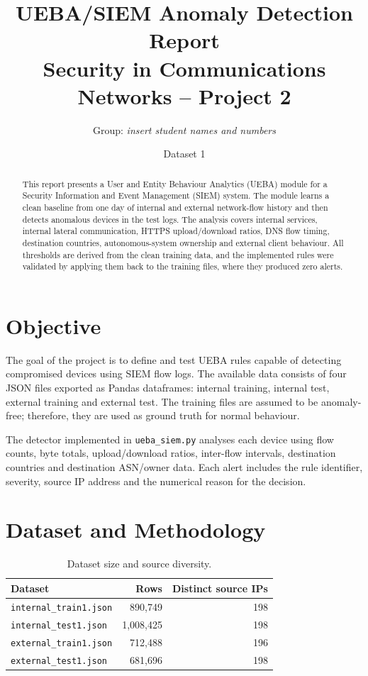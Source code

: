 \documentclass[11pt,a4paper]{article}
\title{\textbf{UEBA/SIEM Anomaly Detection Report}\\
\large Security in Communications Networks -- Project 2}
\author{Group: \textit{insert student names and numbers}}
\date{Dataset 1}
\newcommand{\dataset}[1]{\texttt{#1}}
\begin{document}
\maketitle

\begin{abstract}
This report presents a User and Entity Behaviour Analytics (UEBA) module for a
Security Information and Event Management (SIEM) system. The module learns a
clean baseline from one day of internal and external network-flow history and
then detects anomalous devices in the test logs. The analysis covers internal
services, internal lateral communication, HTTPS upload/download ratios, DNS
flow timing, destination countries, autonomous-system ownership and external
client behaviour. All thresholds are derived from the clean training data, and
the implemented rules were validated by applying them back to the training
files, where they produced zero alerts.
\end{abstract}

\section{Objective}

The goal of the project is to define and test UEBA rules capable of detecting
compromised devices using SIEM flow logs. The available data consists of four
JSON files exported as Pandas dataframes: internal training, internal test,
external training and external test. The training files are assumed to be
anomaly-free; therefore, they are used as ground truth for normal behaviour.

The detector implemented in \dataset{ueba\_siem.py} analyses each device using
flow counts, byte totals, upload/download ratios, inter-flow intervals,
destination countries and destination ASN/owner data. Each alert includes the
rule identifier, severity, source IP address and the numerical reason for the
decision.

\section{Dataset and Methodology}

\begin{table}[H]
\centering
\caption{Dataset size and source diversity.}
\begin{tabular}{lrr}
\toprule
Dataset & Rows & Distinct source IPs \\
\midrule
\dataset{internal\_train1.json} & 890,749 & 198 \\
\dataset{internal\_test1.json} & 1,008,425 & 198 \\
\dataset{external\_train1.json} & 712,488 & 196 \\
\dataset{external\_test1.json} & 681,696 & 198 \\
\bottomrule
\end{tabular}
\end{table}
\end{document}
